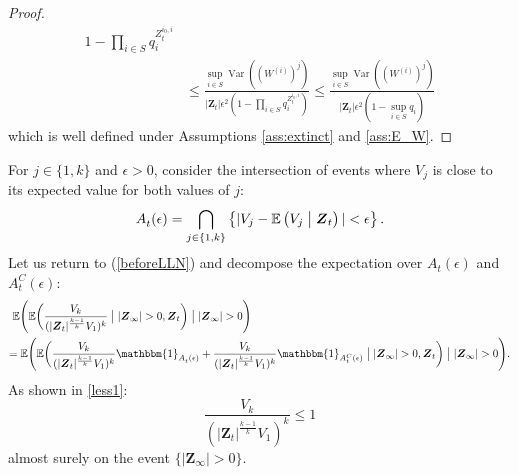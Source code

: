 \documentclass[preprint,3p,12pt]{elsarticle}
\theoremstyle{definition}
\newcommand{\Var}{\operatorname{Var}}
\newcommand{\A}[1][]{A_t^{#1}(\epsilon)}
\newcommand{\z}[1][i_0, i]{Z_t^{#1}}
\newcommand{\V}[1]{V_{#1}}
\begin{document}
\begin{proof}
\begin{align*}
    {1 - \prod_{i \in S}q_i^{\z}} \nonumber \\
    &\le \frac{\sup_{i \in S}{\Var((W^{(i)})^j)}}{|\boldsymbol{Z}_t| \epsilon^2(1 - \prod_{i \in S}q_i^{\z})}
    \le \frac{\sup_{i \in S}{\Var((W^{(i)})^j)}}{|\boldsymbol{Z}_t| \epsilon^2(1 - \sup_{i \in S}q_i)} \label{eq:dependency_population}
\end{align*}
    which is well defined under Assumptions \ref{ass:extinct} and \ref{ass:E_W}.
\end{proof}
For $j \in \{1, k\}$ and $\epsilon > 0$, consider the intersection of events where $\V{j}$ is close to its expected value for both values of $j$:
\begin{equation*}
    \A = \bigcap_{j\in \{1,k\}} \left\{|\V{j} - \mathbb{E}\left(\V{j}\bigm|  \boldsymbol{Z}_t\right) |<\epsilon \right\}.
\end{equation*} 
Let us return to (\ref{beforeLLN}) and decompose the expectation over $\A$ and $\A[C]$:
\begin{align}
    \mathbb{E}\Bigg(\mathbb{E}\bigg(&\frac{\V{k}} 
    {(|\boldsymbol{Z}_t|^{\frac{k-1}{k}}\V{1})^k}\bigm| |\boldsymbol{Z}_{\infty}| > 0, \boldsymbol{Z}_t  \bigg)  \bigm| |\boldsymbol{Z}_{\infty}| > 0\Bigg) \\
    = \mathbb{E}\Bigg(\mathbb{E}&\bigg(\frac{\V{k}}
    {(|\boldsymbol{Z}_t|^{\frac{k-1}{k}}\V{1})^k} \mathbbm{1}_{\A} + %
    \frac{\V{k}}
    {(|\boldsymbol{Z}_t|^{\frac{k-1}{k}}\V{1})^k} \mathbbm{1}_{\A[C]}
    \bigm| |\boldsymbol{Z}_{\infty}| > 0,\boldsymbol{Z}_t  \bigg)\bigm| |\boldsymbol{Z}_{\infty}| > 0\Bigg) \label{before_bound}.
    \end{align}
As shown in \ref{less1}:
    \begin{equation}
      \frac{\V{k}}
    {(|\boldsymbol{Z}_t|^{\frac{k-1}{k}}\V{1})^k} \le 1 \label{less_than1}
    \end{equation}
    almost surely on the event $\{|\boldsymbol{Z}_{\infty}| > 0\}$.
    
\end{document}
